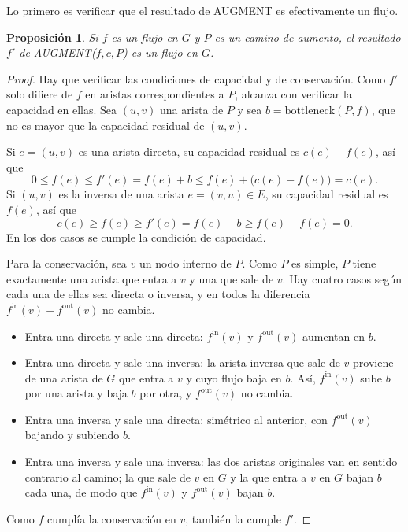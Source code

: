 \documentclass[12pt, spanish, oneside, openany]{book}
\newcommand{\alg}[1]{#1}
\theoremstyle{uprightplain}
\newtheorem{proposicion}[teorema]{Proposición}
\theoremstyle{definition}
\theoremstyle{remark}
\theoremstyle{definition}
\begin{document}
Lo primero es verificar que el resultado de \alg{AUGMENT} es efectivamente un flujo.

\begin{proposicion}
\label{prop:flujo-augment-es-flujo}
Si $f$ es un flujo en $G$ y $P$ es un camino de aumento, el resultado $f'$ de \alg{AUGMENT}($f,c,P$) es un flujo en $G$.
\end{proposicion}
\begin{proof}
Hay que verificar las condiciones de capacidad y de conservación. Como $f'$ solo difiere de $f$ en aristas correspondientes a $P$, alcanza con verificar la capacidad en ellas. Sea $(u,v)$ una arista de $P$ y sea $b=\mathrm{bottleneck}(P,f)$, que no es mayor que la capacidad residual de $(u,v)$.

Si $e=(u,v)$ es una arista directa, su capacidad residual es $c(e)-f(e)$, así que
\[
0\le f(e)\le f'(e)=f(e)+b\le f(e)+\bigl(c(e)-f(e)\bigr)=c(e).
\]
Si $(u,v)$ es la inversa de una arista $e=(v,u)\in E$, su capacidad residual es $f(e)$, así que
\[
c(e)\ge f(e)\ge f'(e)=f(e)-b\ge f(e)-f(e)=0.
\]
En los dos casos se cumple la condición de capacidad.

Para la conservación, sea $v$ un nodo interno de $P$. Como $P$ es simple, $P$ tiene exactamente una arista que entra a $v$ y una que sale de $v$. Hay cuatro casos según cada una de ellas sea directa o inversa, y en todos la diferencia $f^{\mathrm{in}}(v)-f^{\mathrm{out}}(v)$ no cambia.
\begin{itemize}
    \item Entra una directa y sale una directa: $f^{\mathrm{in}}(v)$ y $f^{\mathrm{out}}(v)$ aumentan en $b$.
    \item Entra una directa y sale una inversa: la arista inversa que sale de $v$ proviene de una arista de $G$ que entra a $v$ y cuyo flujo baja en $b$. Así, $f^{\mathrm{in}}(v)$ sube $b$ por una arista y baja $b$ por otra, y $f^{\mathrm{out}}(v)$ no cambia.
    \item Entra una inversa y sale una directa: simétrico al anterior, con $f^{\mathrm{out}}(v)$ bajando y subiendo $b$.
    \item Entra una inversa y sale una inversa: las dos aristas originales van en sentido contrario al camino; la que sale de $v$ en $G$ y la que entra a $v$ en $G$ bajan $b$ cada una, de modo que $f^{\mathrm{in}}(v)$ y $f^{\mathrm{out}}(v)$ bajan $b$.
\end{itemize}
Como $f$ cumplía la conservación en $v$, también la cumple $f'$.
\end{proof}
\end{document}
